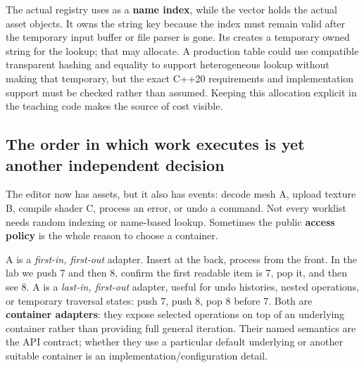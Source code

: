 The actual registry uses  as a \textbf{name index}, while the vector holds the actual asset objects. It owns the string key because the index must remain valid after the temporary input buffer or file parser is gone. Its  creates a temporary owned string for the lookup; that may allocate. A production table could use compatible transparent hashing and equality to support heterogeneous lookup without making that temporary, but the exact C++20 requirements and implementation support must be checked rather than assumed. Keeping this allocation explicit in the teaching code makes the source of cost visible.

\subsection{The order in which work executes is yet another independent decision}\label{05-engine-i-ch005-the-order-in-which-work-executes-is-yet-another-independent-decision}

\hypertarget{05-engine-i-ch005-the-order-in-which-work-executes-is-yet-another-independent-decision}{}

The editor now has assets, but it also has events: decode mesh A, upload texture B, compile shader C, process an error, or undo a command. Not every worklist needs random indexing or name-based lookup. Sometimes the public \textbf{access policy} is the whole reason to choose a container.

A  is a \emph{first-in, first-out} adapter. Insert at the back, process from the front. In the lab we push 7 and then 8, confirm the first readable item is 7, pop it, and then see 8. A  is a \emph{last-in, first-out} adapter, useful for undo histories, nested operations, or temporary traversal states: push 7, push 8, pop 8 before 7. Both are \textbf{container adapters}: they expose selected operations on top of an underlying container rather than providing full general iteration. Their named semantics are the API contract; whether they use a particular default underlying  or another suitable container is an implementation/configuration detail.

